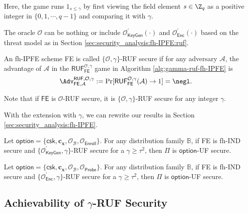 Here, the game runs $1_{s \leq \gamma}$ by first viewing the field element $s \in \Z_q$ as a positive integer in $\{0, 1, \cdots, q-1 \}$ and comparing it with $\gamma$.

The oracle $\mathcal{O}$ can be nothing or include $\mathcal{O}^\prime_{\textsf{KeyGen}}(\cdot)$ and $\mathcal{O}^\prime_{\textsf{Enc}}(\cdot)$ based on the threat model as in Section \ref{sec:security_analysis:fh-IPFE:ruf}.

\begin{definition}

	An fh-IPFE scheme \textsf{FE} is called $\{ \mathcal{O}, \gamma \}$-RUF secure if for any adversary $\mathcal{A}$, the advantage of $\mathcal{A}$ in the $\textsf{RUF}^{\mathcal{O}, \gamma}_\textsf{FE}$ game in Algorithm \ref{alg:gamma-ruf-fh-IPFE} is
\[
	\Adv_{\textsf{FE}, \mathcal{A}}^{\textsf{RUF}, \mathcal{O}, \gamma} := \Pr[\textsf{RUF}^{\mathcal{O}, \gamma}_{\textsf{FE}}(\mathcal{A}) \to 1 ] = \negl.
\]

\noindent Note that if $\textsf{FE}$ is $\mathcal{O}$-RUF secure, it is $\{ \mathcal{O}, \gamma \}$-RUF secure for any integer $\gamma$.
\end{definition}

With the extension with $\gamma$, we can rewrite our results in Section \ref{sec:security_analysis:fh-IPFE}.


\begin{theorem}
\label{thm:fh-IPFE:ind-gamma-ruf-OB-Enroll}
	Let $\textsf{option} = \{ \textsf{csk}, \mathbf{c_x}, \mathcal{O}_\mathcal{B}, \mathcal{O}_{\textsf{Enroll}} \}$. For any distribution family $\mathbb{B}$, if \textsf{FE} is fh-IND secure and $\{ \mathcal{O}^\prime_{\textsf{KeyGen}}, \gamma \}$-RUF secure for a $\gamma \geq \tau^2$, then $\Pi$ is $\textsf{option}$-UF secure. 
\end{theorem}

\begin{theorem}
\label{thm:fh-IPFE:ind-gamma-ruf-OB-Probe}
	Let $\textsf{option} = \{\textsf{csk}, \mathbf{c_x}, \mathcal{O}_\mathcal{B}, \mathcal{O}_\textsf{Probe}\}$. For any distribution family $\mathbb{B}$, if \textsf{FE} is fh-IND secure and $\{ \mathcal{O}^\prime_{\textsf{Enc}}, \gamma \}$-RUF secure for a $\gamma \geq \tau^2$, then $\Pi$ is $\textsf{option}$-UF secure. 
\end{theorem}

\subsection{Achievability of $\gamma$-RUF Security}

